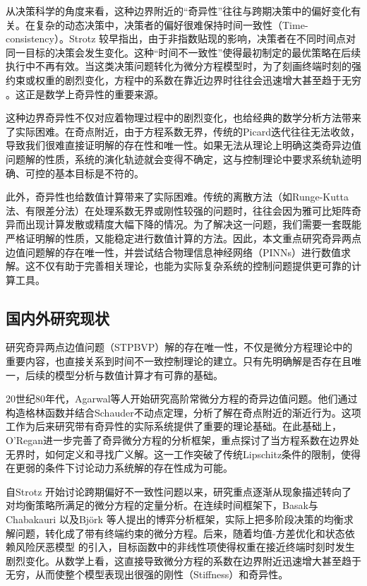\documentclass{GZUbachelorthesis}
\begin{document}
从决策科学的角度来看，这种边界附近的“奇异性”往往与跨期决策中的偏好变化有关。在复杂的动态决策中，决策者的偏好很难保持时间一致性（Time-consistency）。Strotz \cite{strotz1955myopia} 较早指出，由于非指数贴现的影响，决策者在不同时间点对同一目标的决策会发生变化。这种“时间不一致性”使得最初制定的最优策略在后续执行中不再有效。当这类决策问题转化为微分方程模型时，为了刻画终端时刻的强约束或权重的剧烈变化，方程中的系数在靠近边界时往往会迅速增大甚至趋于无穷 \cite{yong2012deterministic}。这正是数学上奇异性的重要来源。

这种边界奇异性不仅对应着物理过程中的剧烈变化，也给经典的数学分析方法带来了实际困难。在奇点附近，由于方程系数无界，传统的Picard迭代往往无法收敛，导致我们很难直接证明解的存在性和唯一性\cite{o1997existence}。如果无法从理论上明确这类奇异边值问题解的性质，系统的演化轨迹就会变得不确定，这与控制理论中要求系统轨迹明确、可控的基本目标是不符的。

此外，奇异性也给数值计算带来了实际困难。传统的离散方法（如Runge-Kutta法、有限差分法）在处理系数无界或刚性较强的问题时，往往会因为雅可比矩阵奇异而出现计算发散或精度大幅下降的情况\cite{ascher1995numerical}。为了解决这一问题，我们需要一套既能严格证明解的性质，又能稳定进行数值计算的方法。因此，本文重点研究奇异两点边值问题解的存在唯一性，并尝试结合物理信息神经网络（PINNs）进行数值求解。这不仅有助于完善相关理论，也能为实际复杂系统的控制问题提供更可靠的计算工具。

\subsection{国内外研究现状}

研究奇异两点边值问题（STPBVP）解的存在唯一性，不仅是微分方程理论中的重要内容，也直接关系到时间不一致控制理论的建立。只有先明确解是否存在且唯一，后续的模型分析与数值计算才有可靠的基础。

20世纪80年代，Agarwal等人\cite{agarwal1986boundary}开始研究高阶常微分方程的奇异边值问题。他们通过构造格林函数并结合Schauder不动点定理，分析了解在奇点附近的渐近行为。这项工作为后来研究带有奇异性的实际系统提供了重要的理论基础。在此基础上，O'Regan\cite{o1997existence}进一步完善了奇异微分方程的分析框架，重点探讨了当方程系数在边界处无界时，如何定义和寻找广义解。这一工作突破了传统Lipschitz条件的限制，使得在更弱的条件下讨论动力系统解的存在性成为可能。

自Strotz \cite{strotz1955myopia} 开始讨论跨期偏好不一致性问题以来，研究重点逐渐从现象描述转向了对均衡策略所满足的微分方程的定量分析。在连续时间框架下，Basak与Chabakauri \cite{basak2010dynamic} 以及Björk \cite{bjork2010general} 等人提出的博弈分析框架，实际上把多阶段决策的均衡求解问题，转化成了带有终端约束的微分方程。后来，随着均值-方差优化和状态依赖风险厌恶模型 \cite{bjork2014mean} 的引入，目标函数中的非线性项使得权重在接近终端时刻时发生剧烈变化。从数学上看，这直接导致微分方程的系数在边界附近迅速增大甚至趋于无穷，从而使整个模型表现出很强的刚性（Stiffness）和奇异性。
\end{document}
